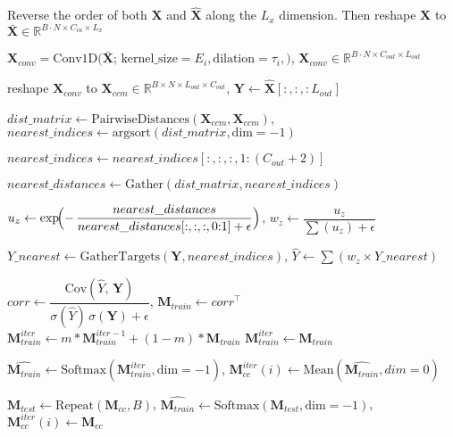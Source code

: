 \begin{algorithm*}[t]
\begin{algorithmic}[1]
        \State Reverse the order of both $\mathbf{X}$ and $\hat{\mathbf{X}}$ along the $L_x$ dimension. Then reshape $\mathbf{X}$ to $\bar{\mathbf{X}} \in \mathbb{R}^{B \cdot N\times C_{in}\times L_x}$
 
        \State $\mathbf{X}_{conv} = \text{Conv1D}\bigl(\bar{\mathbf{X}};\,\text{kernel\_size}=E_i,\text{dilation}=\tau_i,
        \bigr)$, 
        $\mathbf{X}_{conv} \in \mathbb{R}^{B \cdot N\times C_{out}\times  L_{out}}$ 

            \State reshape $\mathbf{X}_{conv}$ to $\mathbf{X}_{ccm}\in \mathbb{R}^{B \times N \times L_{out} \times C_{out}}$, $\mathbf{Y} \gets \hat{\mathbf{X}}[:, :,  :L_{out}]$
            
            \State $dist\_matrix \gets \text{PairwiseDistances} (\mathbf{X}_{ccm}, \mathbf{X}_{ccm})$, $nearest\_indices \gets \text{argsort}(dist\_matrix, \text{dim}=-1)$

            \State $nearest\_indices \gets nearest\_indices[:, :, :, 1:(C_{out}+2)]$ 
            
            \State $nearest\_distances \gets \text{Gather}(dist\_matrix, nearest\_indices)$

            \State $u_z \gets \exp\!\Bigl(-\,\dfrac{nearest\_distances}{nearest\_distances[:, :, :, 0{:}1] + \epsilon}\Bigr)$, 
        $w_z \gets \dfrac{u_z}{\sum(u_z) + \epsilon}$

            \State $Y\_nearest \gets \text{GatherTargets}( \mathbf{Y}, nearest\_indices )$, $\hat{Y} \gets \sum (w_z \times Y\_nearest)$

            \State $corr \gets \dfrac{\mathrm{Cov}(\hat{Y},\, \mathbf{Y})}{\sigma(\hat{Y})\,\sigma(\mathbf{Y}) + \epsilon}$,  $\mathbf{M}_{train} \gets corr^\top$ 
                \State $\mathbf{M}_{train}^{iter} \gets m * \mathbf{M}^{iter-1}_{train} + (1- m) * \mathbf{M}_{train}$
            \Else 
            \State $\mathbf{M}_{train}^{iter} \gets \mathbf{M}_{train}$
            
            \EndIf
             \State $ \widehat{\mathbf{M}_{train}}  \gets \text{Softmax}(\mathbf{M}_{train}^{iter}, \text{dim}=-1)$,
             $\mathbf{M}_{cc}^{iter}(i) \gets \text{Mean}(\widehat{\mathbf{M}_{train}}, dim=0)$
        

        \Else
            \State $\mathbf{M}_{test} \gets \text{Repeat}(\mathbf{M}_{cc}, B)$, $ \widehat{\mathbf{M}_{train}}  \gets \text{Softmax}(\mathbf{M}_{test}, \text{dim}=-1)$, $\mathbf{M}_{cc}^{iter}(i) \gets \mathbf{M}_{cc}$
            

\end{algorithmic}
\end{algorithm*}
